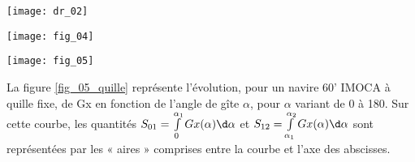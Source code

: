 \ifprof
\else
\begin{center}
\texttt{[image: dr\_02]}
\end{center}

\vspace{.5cm}

%
%

\vspace{.5cm}

\begin{minipage}[b]{.47\linewidth}
\begin{center}
\texttt{[image: fig\_04]}
\end{center}
\end{minipage}\hfill
\begin{minipage}[b]{.47\linewidth}
\begin{center}
\texttt{[image: fig\_05]}
\end{center}
 \end{minipage}
 

La figure \ref{fig_05_quille} représente l’évolution, pour un navire 60’ IMOCA à quille fixe, de Gx en fonction de l’angle de gîte $\alpha$, pour $\alpha$ variant de 0 à 180\degres. Sur cette courbe, les quantités 
$S_{01}=\int\limits_{0}^{\alpha_1} Gx(\alpha) \d \alpha$ et 
$S_{12}=\int\limits_{\alpha_1}^{\alpha_2} Gx(\alpha) \d \alpha$  
 sont représentées par les « aires » comprises entre la courbe et l’axe des abscisses.
 
